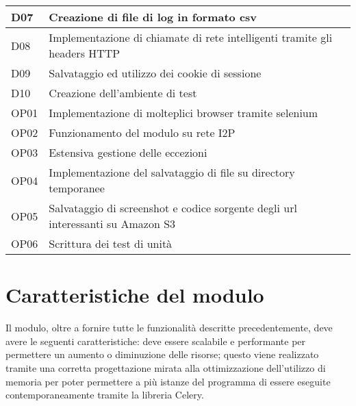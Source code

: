 \begin{longtable}{|p{}|p{}|}
    \hline
    D07			&	Creazione di file di log in formato csv \\
    \hline
    D08			&	Implementazione di chiamate di rete intelligenti tramite gli headers HTTP \\
    \hline
    D09			&	Salvataggio ed utilizzo dei cookie di sessione \\
    \hline
    D10			&	Creazione dell'ambiente di test \\
    \hline
    OP01		&	Implementazione di molteplici browser tramite selenium \\
    \hline
    OP02		&	Funzionamento del modulo su rete I2P \\
    \hline
    OP03		&	Estensiva gestione delle eccezioni \\
    \hline
    OP04		&	Implementazione del salvataggio di file su directory temporanee \\
    \hline
    OP05		&	Salvataggio di screenshot e codice sorgente degli url interessanti su Amazon S3 \\
    \hline
    OP06		&	Scrittura dei test di unità \\
    \hline
\end{longtable}%

\section{Caratteristiche del modulo}

Il modulo, oltre a fornire tutte le funzionalità descritte precedentemente, deve avere le
seguenti caratteristiche: deve essere scalabile e performante per permettere un aumento o diminuzione delle risorse; questo viene realizzato tramite una corretta progettazione mirata alla ottimizzazione dell'utilizzo di memoria per poter permettere a più istanze del programma di essere eseguite contemporaneamente tramite la libreria Celery.